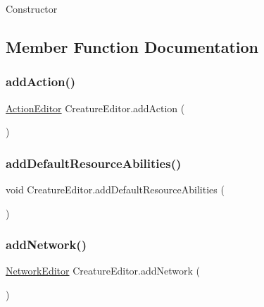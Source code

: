 Constructor 



\subsection{Member Function Documentation}
\mbox{\label{class_creature_editor_a558b61296fbae7699cfafdcc02bd8858}} 
\subsubsection{\texorpdfstring{add\+Action()}{addAction()}}
{\footnotesize\ttfamily \mbox{\hyperlink{class_action_editor}{Action\+Editor}} Creature\+Editor.\+add\+Action (\begin{DoxyParamCaption}{ }\end{DoxyParamCaption})}

\mbox{\label{class_creature_editor_a73b06f4546ad17a435f487a3a515e661}} 
\subsubsection{\texorpdfstring{add\+Default\+Resource\+Abilities()}{addDefaultResourceAbilities()}}
{\footnotesize\ttfamily void Creature\+Editor.\+add\+Default\+Resource\+Abilities (\begin{DoxyParamCaption}{ }\end{DoxyParamCaption})}

\mbox{\label{class_creature_editor_a2c3d33249073a6af3cd536cc02832635}} 
\subsubsection{\texorpdfstring{add\+Network()}{addNetwork()}}
{\footnotesize\ttfamily \mbox{\hyperlink{class_network_editor}{Network\+Editor}} Creature\+Editor.\+add\+Network (\begin{DoxyParamCaption}{ }\end{DoxyParamCaption})}



